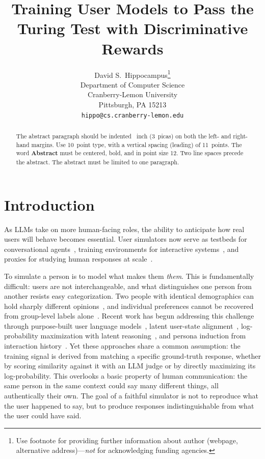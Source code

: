 \documentclass{article}
\title{Training User Models to Pass the Turing Test with Discriminative Rewards}
\author{%
  David S.~Hippocampus\thanks{Use footnote for providing further information
    about author (webpage, alternative address)---\emph{not} for acknowledging
    funding agencies.} \\
  Department of Computer Science\\
  Cranberry-Lemon University\\
  Pittsburgh, PA 15213 \\
  \texttt{hippo@cs.cranberry-lemon.edu} \\
}
\begin{document}
\maketitle


\begin{abstract}
  The abstract paragraph should be indented ~inch (3~picas) on both the left- and right-hand margins. Use 10~point type, with a vertical spacing (leading) of 11~points. The word \textbf{Abstract} must be centered, bold, and in point size 12. Two line spaces precede the abstract. The abstract must be limited to one paragraph.
\end{abstract}



\section{Introduction}
 
As LLMs take on more human-facing roles, the ability to anticipate how real users will behave becomes essential. User simulators now serve as testbeds for conversational agents~\citep{naous2025flipping}, training environments for interactive systems~\citep{abdulhai2025consistently, mehri2025goal}, and proxies for studying human responses at scale~\citep{park2023generative, aher2023simulating, lu2025multiturn}.
 
To simulate a person is to model what makes them \textit{them}. This is fundamentally difficult: users are not interchangeable, and what distinguishes one person from another resists easy categorization. Two people with identical demographics can hold sharply different opinions~\citep{hwang2023aligning, santurkar2023opinions}, and individual preferences cannot be recovered from group-level labels alone~\citep{jiang2024indievalue, kirk2024prism}. Recent work has begun addressing this challenge through purpose-built user language models~\citep{naous2025flipping}, latent user-state alignment~\citep{wu2026humanlm}, log-probability maximization with latent reasoning~\citep{gandhi2026dialogue}, and persona induction from interaction history~\citep{ryan2025synthesizeme}. Yet these approaches share a common assumption: the training signal is derived from matching a specific ground-truth response, whether by scoring similarity against it with an LLM judge or by directly maximizing its log-probability. This overlooks a basic property of human communication: the same person in the same context could say many different things, all authentically their own. The goal of a faithful simulator is not to reproduce what the user happened to say, but to produce responses indistinguishable from what the user could have said.
 
\end{document}
